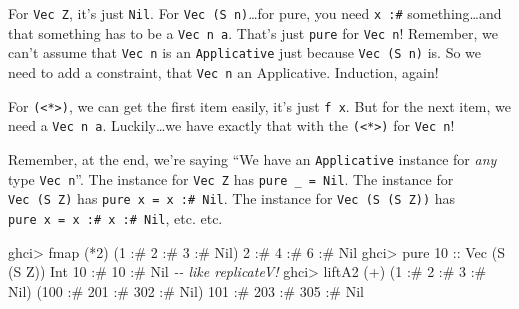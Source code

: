 \documentclass[]{article}
\newenvironment{Shaded}{}{}
\newcommand{\CommentTok}[1]{\textcolor[rgb]{0.38,0.63,0.69}{\textit{#1}}}
\newcommand{\DataTypeTok}[1]{\textcolor[rgb]{0.56,0.13,0.00}{#1}}
\newcommand{\DecValTok}[1]{\textcolor[rgb]{0.25,0.63,0.44}{#1}}
\newcommand{\FunctionTok}[1]{\textcolor[rgb]{0.02,0.16,0.49}{#1}}
\newcommand{\NormalTok}[1]{#1}
\newcommand{\OperatorTok}[1]{\textcolor[rgb]{0.40,0.40,0.40}{#1}}
\newcommand{\OtherTok}[1]{\textcolor[rgb]{0.00,0.44,0.13}{#1}}
\begin{document}
For \texttt{Vec\ Z}, it's just \texttt{Nil}. For \texttt{Vec\ (S\ n)}\ldots for
pure, you need \texttt{x\ :\#} something\ldots and that something has to be a
\texttt{Vec\ n\ a}. That's just \texttt{pure} for \texttt{Vec\ n}! Remember, we
can't assume that \texttt{Vec\ n} is an \texttt{Applicative} just because
\texttt{Vec\ (S\ n)} is. So we need to add a constraint, that \texttt{Vec\ n} an
Applicative. Induction, again!

For \texttt{(\textless{}*\textgreater{})}, we can get the first item easily,
it's just \texttt{f\ x}. But for the next item, we need a \texttt{Vec\ n\ a}.
Luckily\ldots we have exactly that with the
\texttt{(\textless{}*\textgreater{})} for \texttt{Vec\ n}!

Remember, at the end, we're saying ``We have an \texttt{Applicative} instance
for \emph{any} type \texttt{Vec\ n}''. The instance for \texttt{Vec\ Z} has
\texttt{pure\ \_\ =\ Nil}. The instance for \texttt{Vec\ (S\ Z)} has
\texttt{pure\ x\ =\ x\ :\#\ Nil}. The instance for \texttt{Vec\ (S\ (S\ Z))} has
\texttt{pure\ x\ =\ x\ :\#\ x\ :\#\ Nil}, etc. etc.

\begin{Shaded}
\begin{Highlighting}[]
\NormalTok{ghci}\OperatorTok{\textgreater{}} \FunctionTok{fmap}\NormalTok{ (}\OperatorTok{*}\DecValTok{2}\NormalTok{) (}\DecValTok{1} \OperatorTok{:\#} \DecValTok{2} \OperatorTok{:\#} \DecValTok{3} \OperatorTok{:\#} \DataTypeTok{Nil}\NormalTok{)}
\DecValTok{2} \OperatorTok{:\#} \DecValTok{4} \OperatorTok{:\#} \DecValTok{6} \OperatorTok{:\#} \DataTypeTok{Nil}
\NormalTok{ghci}\OperatorTok{\textgreater{}} \FunctionTok{pure} \DecValTok{10}\OtherTok{ ::} \DataTypeTok{Vec}\NormalTok{ (}\DataTypeTok{S}\NormalTok{ (}\DataTypeTok{S} \DataTypeTok{Z}\NormalTok{)) }\DataTypeTok{Int}
\DecValTok{10} \OperatorTok{:\#} \DecValTok{10} \OperatorTok{:\#} \DataTypeTok{Nil}         \CommentTok{{-}{-} like replicateV!}
\NormalTok{ghci}\OperatorTok{\textgreater{}}\NormalTok{ liftA2 (}\OperatorTok{+}\NormalTok{) (}\DecValTok{1} \OperatorTok{:\#} \DecValTok{2} \OperatorTok{:\#} \DecValTok{3} \OperatorTok{:\#} \DataTypeTok{Nil}\NormalTok{) (}\DecValTok{100} \OperatorTok{:\#} \DecValTok{201} \OperatorTok{:\#} \DecValTok{302} \OperatorTok{:\#} \DataTypeTok{Nil}\NormalTok{)}
\DecValTok{101} \OperatorTok{:\#} \DecValTok{203} \OperatorTok{:\#} \DecValTok{305} \OperatorTok{:\#} \DataTypeTok{Nil}
\end{Highlighting}
\end{Shaded}
\end{document}
